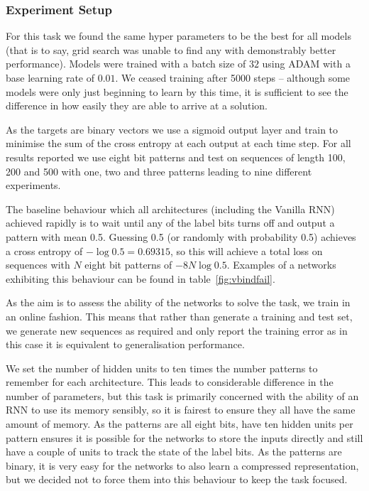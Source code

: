 \subsubsection{Experiment Setup}
For this task we found the same hyper parameters to be the best for all models
(that is to say, grid search was unable to find any with demonstrably better performance).
Models were trained with a batch size of \(32\) using ADAM with a base learning rate of \(0.01\).
We ceased training after 5000 steps --  although some models were only just beginning to learn
by this time, it is sufficient to see the difference in how easily they are able to arrive
at a solution.

As the targets are binary vectors we use a sigmoid output layer and train to minimise the
sum of the cross entropy at each output at each time step.
For all results reported we use eight bit patterns and test on sequences of length 100, 200 and 500
with one, two and three patterns leading to nine different experiments.

The baseline behaviour which all architectures (including the Vanilla RNN) achieved rapidly
is to wait until any of the label bits turns off and output a pattern with mean 0.5. Guessing
0.5 (or randomly with probability 0.5) achieves a cross entropy of \(-\log 0.5 = 0.69315\), so
this will achieve a total loss on sequences with \(N\) eight bit patterns of \(-8N\log 0.5\).
Examples of a networks exhibiting this behaviour can be found in table~\ref{fig:vbindfail}.

As the aim is to assess the ability of the networks to solve the task, we train in an online
fashion. This means that rather than generate a training and test set, we generate new sequences
as required and only report the training error as in this case it is equivalent to generalisation
performance.

We set the number of hidden units to ten times the number patterns to remember for each architecture.
This leads to considerable difference in the number of parameters, but this task is primarily
concerned with the ability of an RNN to use its memory sensibly, so it is fairest to ensure they
all have the same amount of memory. As the patterns are all eight bits, have ten hidden units
per pattern ensures it is possible for the networks to store the inputs directly and still have
a couple of units to track the state of the label bits. As the patterns are binary, it is very
easy for the networks to also learn a compressed representation, but we decided not to force them
into this behaviour to keep the task focused.

